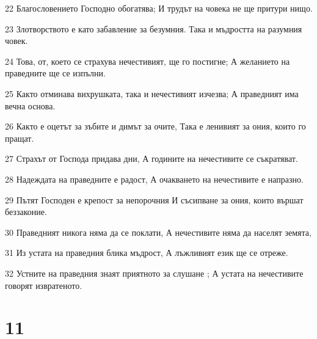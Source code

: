 \par 22 Благословението Господно обогатява; И трудът на човека не ще притури нищо.
\par 23 Злотворството е като забавление за безумния. Така и мъдростта на разумния човек.
\par 24 Това, от, което се страхува нечестивият, ще го постигне; А желанието на праведните ще се изпълни.
\par 25 Както отминава вихрушката, така и нечестивият изчезва; А праведният има вечна основа.
\par 26 Както е оцетът за зъбите и димът за очите, Така е ленивият за ония, които го пращат.
\par 27 Страхът от Господа придава дни, А годините на нечестивите се съкратяват.
\par 28 Надеждата на праведните е радост, А очакването на нечестивите е напразно.
\par 29 Пътят Господен е крепост за непорочния И съсипване за ония, които вършат беззаконие.
\par 30 Праведният никога няма да се поклати, А нечестивите няма да населят земята,
\par 31 Из устата на праведния блика мъдрост, А лъжливият език ще се отреже.
\par 32 Устните на праведния знаят приятното за слушане ; А устата на нечестивите говорят извратеното.

\chapter{11}

